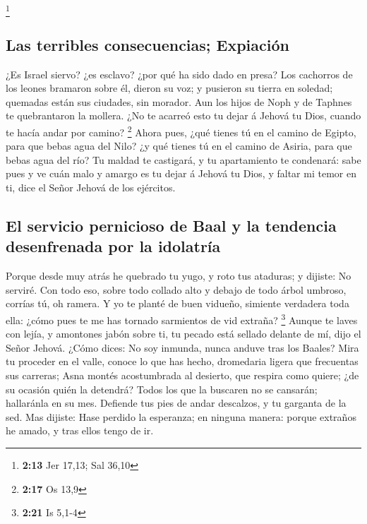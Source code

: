 \footnote{\textbf{2:13} Jer 17,13; Sal 36,10}

\hypertarget{las-terribles-consecuencias-expiaciuxf3n}{%
\subsection{Las terribles consecuencias;
Expiación}\label{las-terribles-consecuencias-expiaciuxf3n}}

 ¿Es Israel siervo? ¿es esclavo? ¿por qué ha sido dado en
presa?  Los cachorros de los leones bramaron sobre él,
dieron su voz; y pusieron su tierra en soledad; quemadas están sus
ciudades, sin morador.  Aun los hijos de Noph y de Taphnes
te quebrantaron la mollera.  ¿No te acarreó esto tu dejar á
Jehová tu Dios, cuando te hacía andar por camino? \footnote{\textbf{2:17}
  Os 13,9}  Ahora pues, ¿qué tienes tú en el camino de
Egipto, para que bebas agua del Nilo? ¿y qué tienes tú en el camino de
Asiria, para que bebas agua del río?  Tu maldad te
castigará, y tu apartamiento te condenará: sabe pues y ve cuán malo y
amargo es tu dejar á Jehová tu Dios, y faltar mi temor en ti, dice el
Señor Jehová de los ejércitos.

\hypertarget{el-servicio-pernicioso-de-baal-y-la-tendencia-desenfrenada-por-la-idolatruxeda}{%
\subsection{El servicio pernicioso de Baal y la tendencia desenfrenada
por la
idolatría}\label{el-servicio-pernicioso-de-baal-y-la-tendencia-desenfrenada-por-la-idolatruxeda}}

 Porque desde muy atrás he quebrado tu yugo, y roto tus
ataduras; y dijiste: No serviré. Con todo eso, sobre todo collado alto y
debajo de todo árbol umbroso, corrías tú, oh ramera.  Y yo
te planté de buen vidueño, simiente verdadera toda ella: ¿cómo pues te
me has tornado sarmientos de vid extraña? \footnote{\textbf{2:21} Is
  5,1-4}  Aunque te laves con lejía, y amontones jabón
sobre ti, tu pecado está sellado delante de mí, dijo el Señor Jehová.
 ¿Cómo dices: No soy inmunda, nunca anduve tras los Baales?
Mira tu proceder en el valle, conoce lo que has hecho, dromedaria ligera
que frecuentas sus carreras;  Asna montés acostumbrada al
desierto, que respira como quiere; ¿de su ocasión quién la detendrá?
Todos los que la buscaren no se cansarán; hallaránla en su mes.
 Defiende tus pies de andar descalzos, y tu garganta de la
sed. Mas dijiste: Hase perdido la esperanza; en ninguna manera: porque
extraños he amado, y tras ellos tengo de ir.


